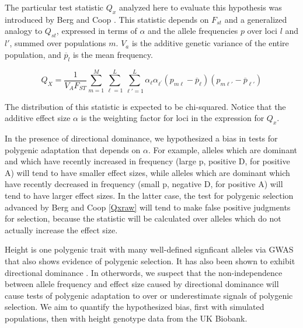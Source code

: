 \documentclass[a4paper,12pt]{article}
\begin{document}
The particular test statistic $Q_x$ analyzed here to evaluate this
hypothesis was introduced by Berg and Coop \cite{berg}. This statistic depends on $F_{st}$ and
a generalized analogy to $Q_{st}$, expressed in terms of $\alpha$ and
the allele frequencies $p$ over loci $l$ and $l'$, summed over
populations $m$. $V_a$ is the additive genetic variance of the entire
population, and $\overline{p}_l$ is the mean frequency.

\begin{equation} \label{Qxraw}
  Q_X = \frac{1}{V_A F_{ST}} \sum_{m=1}^M \sum_{\ell=1}^L \sum_{\ell\prime=1}^L \alpha_{\ell} \alpha_{\ell^{\prime}}\left(p_{m\ell} - \overline{p}_\ell \right)\left(p_{m \ell\prime} - \overline{p}_{\ell\prime}\right)
\end{equation}


The distribution of this statistic is expected to be chi-squared. Notice that the additive effect size $\alpha$ is the weighting factor for loci in the
expression for $Q_x$. 

In the presence of directional dominance, we hypothesized a bias in
tests for polygenic adaptation that depends on $\alpha$. For example, alleles which are dominant and which have recently increased in
frequency (large p, positive D, for positive A) will tend to have smaller effect sizes, while
alleles which are dominant which have recently decreased in frequency
(small p, negative D, for positive A) will tend to have larger effect sizes. In the
latter case, the test for polygenic selection advanced by Berg and Coop
\eqref{Qxraw} will tend to make false positive judgments for
selection, because the statistic will be calculated over alleles which
do not actually increase the effect size.

Height is one polygenic trait with many well-defined signficant
alleles via GWAS \cite{heightselection} that also shows evidence of polygenic selection. It has also been shown to exhibit
directional dominance \cite{heightdirectdom}. In otherwords, we
suspect that the non-independence between allele frequency and effect
size caused by directional dominance will cause tests of polygenic
adaptation to over or underestimate signals of polygenic selection. We aim to quantify the
hypothesized bias, first with simulated populations, then with height genotype data from the UK Biobank.
\end{document}
